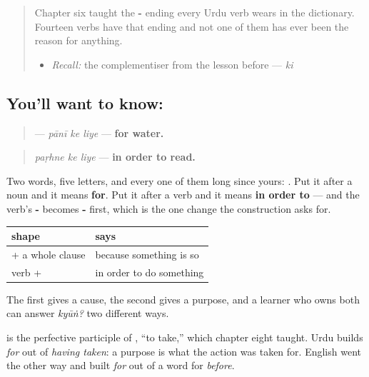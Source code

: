 \label{lesson:UR-C21-ke-liye}



\begin{quote}
Chapter six taught the \textbf{-} ending every Urdu verb wears in the dictionary. Fourteen verbs have that ending and not one of them has ever been the reason for anything.

\begin{itemize}
\raggedright
  \item \emph{Recall:} the complementiser from the lesson before — \emph{ki}
\end{itemize}
\end{quote}

\subsection*{You'll want to know:  }
\begin{quote}
\textbf{  } — \emph{pānī ke liye} — \textbf{for water.}
\end{quote}

\begin{quote}
\emph{paṛhne ke liye} — \textbf{in order to read.}
\end{quote}

Two words, five letters, and every one of them long since yours: \textbf{} \textbf{} \textbf{} \textbf{} \textbf{}. Put it after a noun and it means \textbf{for}. Put it after a verb and it means \textbf{in order to} — and the verb's \textbf{-} becomes \textbf{-} first, which is the one change the construction asks for.

\begin{grammarlens}[title={Grammar Lens: two ways to say why}]
\noindent
\begin{tabularx}{\linewidth}{@{}>{\raggedright\arraybackslash}X>{\raggedright\arraybackslash}X@{}}
\toprule
\textbf{shape} & \textbf{says} \\
\midrule
\textbf{\ur{کیونکہ}} + a whole clause & because something is so \\
verb + \textbf{\ur{کے} \ur{لیے}} & in order to do something \\
\bottomrule
\end{tabularx}

The first gives a cause, the second gives a purpose, and a learner who owns both can answer \emph{kyūṅ?} two different ways.

\textbf{} is the perfective participle of \textbf{}, \textquotedblleft{}to take,\textquotedblright{} which chapter eight taught. Urdu builds \emph{for} out of \emph{having taken}: a purpose is what the action was taken for. English went the other way and built \emph{for} out of a word for \emph{before}.
\end{grammarlens}

